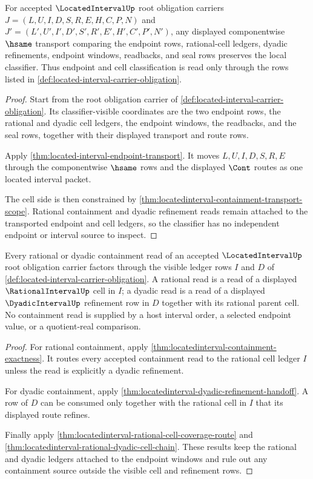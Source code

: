 \begin{theorem}
\label{thm:located-interval-classifier-stability}
For accepted $\LocatedIntervalUp$ root obligation carriers $J=(L,U,I,D,S,R,E,H,C,P,N)$ and $J'=(L',U',I',D',S',R',E',H',C',P',N')$, any displayed componentwise $\hsame$ transport comparing the endpoint rows, rational-cell ledgers, dyadic refinements, endpoint windows, readbacks, and seal rows preserves the local classifier. Thus endpoint and cell classification is read only through the rows listed in \autoref{def:located-interval-carrier-obligation}.
\end{theorem}
\begin{proof}
Start from the root obligation carrier of \autoref{def:located-interval-carrier-obligation}. Its classifier-visible coordinates are the two endpoint rows, the rational and dyadic cell ledgers, the endpoint windows, the readbacks, and the seal rows, together with their displayed transport and route rows.

Apply \autoref{thm:located-interval-endpoint-transport}. It moves $L,U,I,D,S,R,E$ through the componentwise $\hsame$ rows and the displayed $\Cont$ routes as one located interval packet.

The cell side is then constrained by \autoref{thm:locatedinterval-containment-transport-scope}. Rational containment and dyadic refinement reads remain attached to the transported endpoint and cell ledgers, so the classifier has no independent endpoint or interval source to inspect.
\end{proof}

\begin{theorem}
\label{thm:located-interval-ledger-exactness}
Every rational or dyadic containment read of an accepted $\LocatedIntervalUp$ root obligation carrier factors through the visible ledger rows $I$ and $D$ of \autoref{def:located-interval-carrier-obligation}. A rational read is a read of a displayed $\RationalIntervalUp$ cell in $I$; a dyadic read is a read of a displayed $\DyadicIntervalUp$ refinement row in $D$ together with its rational parent cell. No containment read is supplied by a host interval order, a selected endpoint value, or a quotient-real comparison.
\end{theorem}
\begin{proof}
For rational containment, apply \autoref{thm:locatedinterval-containment-exactness}. It routes every accepted containment read to the rational cell ledger $I$ unless the read is explicitly a dyadic refinement.

For dyadic containment, apply \autoref{thm:locatedinterval-dyadic-refinement-handoff}. A row of $D$ can be consumed only together with the rational cell in $I$ that its displayed route refines.

Finally apply \autoref{thm:locatedinterval-rational-cell-coverage-route} and \autoref{thm:locatedinterval-rational-dyadic-cell-chain}. These results keep the rational and dyadic ledgers attached to the endpoint windows and rule out any containment source outside the visible cell and refinement rows.
\end{proof}

